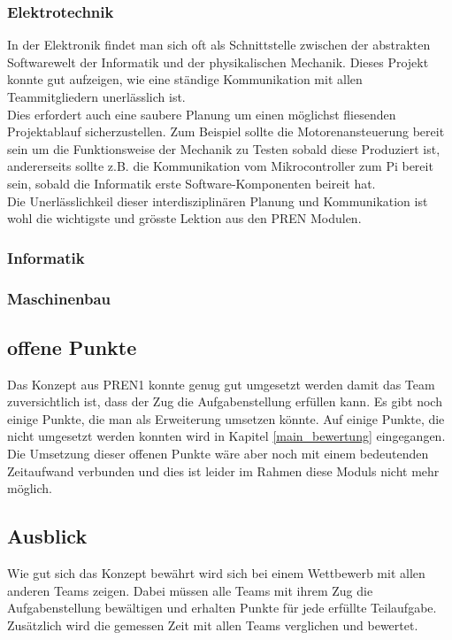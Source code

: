 \documentclass[../../main.tex]{subfiles}
\begin{document}
\subsubsection{Elektrotechnik}
In der Elektronik findet man sich oft als Schnittstelle zwischen der abstrakten Softwarewelt der Informatik und der physikalischen Mechanik. Dieses Projekt konnte gut aufzeigen, wie eine ständige Kommunikation mit allen Teammitgliedern unerlässlich ist.\\
Dies erfordert auch eine saubere Planung um einen möglichst fliesenden Projektablauf sicherzustellen. Zum Beispiel sollte die Motorenansteuerung bereit sein um die Funktionsweise der Mechanik zu Testen sobald diese Produziert ist, andererseits sollte z.B. die Kommunikation vom Mikrocontroller zum Pi bereit sein, sobald die Informatik erste Software-Komponenten beireit hat.\\
Die Unerlässlichkeil dieser interdisziplinären Planung und Kommunikation ist wohl die wichtigste und grösste Lektion aus den PREN Modulen.

\subsubsection{Informatik}

\subsubsection{Maschinenbau}

\subsection{offene Punkte}
Das Konzept aus PREN1 konnte genug gut umgesetzt werden damit das Team zuversichtlich ist, dass der Zug die Aufgabenstellung erfüllen kann. Es gibt noch einige Punkte, die man als Erweiterung umsetzen könnte. Auf einige Punkte, die nicht umgesetzt werden konnten wird in Kapitel \ref{main_bewertung} eingegangen. Die Umsetzung dieser offenen Punkte wäre aber noch mit einem bedeutenden Zeitaufwand verbunden und dies ist leider im Rahmen diese Moduls nicht mehr möglich.

\subsection{Ausblick}
Wie gut sich das Konzept bewährt wird sich bei einem Wettbewerb mit allen anderen Teams zeigen. Dabei müssen alle Teams mit ihrem Zug die Aufgabenstellung bewältigen und erhalten Punkte für jede erfüllte Teilaufgabe. Zusätzlich wird die gemessen Zeit mit allen Teams verglichen und bewertet.
\end{document}
